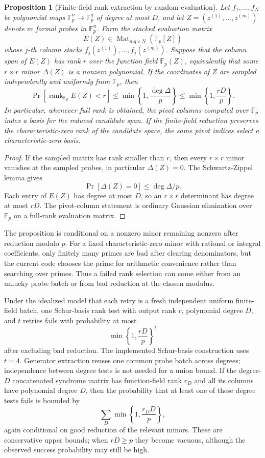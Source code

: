 \documentclass[11pt]{article}
\newcommand{\dsF}{\mathbb{F}}
\newtheorem{proposition}[theorem]{Proposition}
\theoremstyle{definition}
\begin{document}
\begin{proposition}[Finite-field rank extraction by random evaluation]\label{prop:random-rank-test}
  Let $f_1,\dots,f_N$ be polynomial maps $\dsF_p^n\to\dsF_p^q$ of degree at most $D$, and let $Z=(z^{(1)},\dots,z^{(m)})$ denote $m$ formal probes in $\dsF_p^n$.  Form the stacked evaluation matrix
  \[
    E(Z)\in \operatorname{Mat}_{mq\times N}\left(\dsF_p[Z]\right)
  \]
  whose $j$-th column stacks $f_j(z^{(1)}),\dots,f_j(z^{(m)})$.  Suppose that the column span of $E(Z)$ has rank $r$ over the function field $\dsF_p(Z)$, equivalently that some $r\times r$ minor $\Delta(Z)$ is a nonzero polynomial.  If the coordinates of $Z$ are sampled independently and uniformly from $\dsF_p$, then
  \[
    \Pr\left[\operatorname{rank}_{\dsF_p}E(Z)<r\right]
    \le
    \min\left\{1,\frac{\deg\Delta}{p}\right\}
    \le
    \min\left\{1,\frac{rD}{p}\right\}.
  \]
  In particular, whenever full rank is obtained, the pivot columns computed over $\dsF_p$ index a basis for the reduced candidate span.  If the finite-field reduction preserves the characteristic-zero rank of the candidate space, the same pivot indices select a characteristic-zero basis.
\end{proposition}
\begin{proof}
  If the sampled matrix has rank smaller than $r$, then every $r\times r$ minor vanishes at the sampled probes, in particular $\Delta(Z)=0$.  The Schwartz-Zippel lemma gives
  \[
    \Pr[\Delta(Z)=0]\le \deg\Delta/p.
  \]
  Each entry of $E(Z)$ has degree at most $D$, so an $r\times r$ determinant has degree at most $rD$.  The pivot-column statement is ordinary Gaussian elimination over $\dsF_p$ on a full-rank evaluation matrix.
\end{proof}

The proposition is conditional on a nonzero minor remaining nonzero after reduction modulo $p$.  For a fixed characteristic-zero minor with rational or integral coefficients, only finitely many primes are bad after clearing denominators, but the current code chooses the prime for arithmetic convenience rather than searching over primes.  Thus a failed rank selection can come either from an unlucky probe batch or from bad reduction at the chosen modulus.

Under the idealized model that each retry is a fresh independent uniform finite-field batch, one Schur-basis rank test with output rank $r$, polynomial degree $D$, and $t$ retries fails with probability at most
\[
  \min\left\{1,\frac{rD}{p}\right\}^{t}
\]
after excluding bad reduction.  The implemented Schur-basis construction uses $t=4$.  Generator extraction reuses one common probe batch across degrees; independence between degree tests is not needed for a union bound.  If the degree-$D$ concatenated syndrome matrix has function-field rank $r_D$ and all its columns have polynomial degree $D$, then the probability that at least one of these degree tests fails is bounded by
\[
  \sum_D \min\left\{1,\frac{r_DD}{p}\right\},
\]
again conditional on good reduction of the relevant minors.  These are conservative upper bounds; when $rD\ge p$ they become vacuous, although the observed success probability may still be high.
\end{document}
